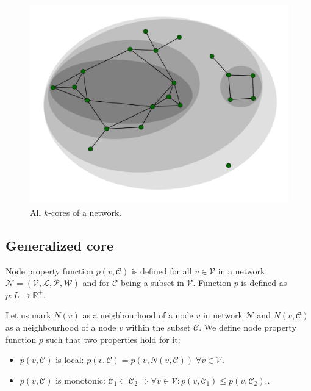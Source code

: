 \documentclass[a4paper,twoside,10pt]{article}
\newcommand{\C}{\mathcal{C}}
\newcommand{\R}{\mathbb{R}}
\begin{document}
\begin{figure}[!h]
	\centering
  \includegraphics[width=\textwidth]{./pics/kcore.pdf}
  \caption{All $k$-cores of a network.}
  \label{kcore}
\end{figure}


\subsection{Generalized core}

Node property function $p(v, \C)$ is defined for all $v \in \mathcal{V}$
in a network $\mathcal{N} = (\mathcal{V}, \mathcal{L}, \mathcal{P}, \mathcal{W})$ and for $\C$ being a subset in $\mathcal{V}$. Function $p$ is defined as $p: L \longrightarrow \R^+$.

Let us mark $N(v)$ as a neighbourhood of a node $v$ in network $\mathcal{N}$ and $N(v, \C)$ as a neighbourhood of a node $v$ within the subset $\C$. We define node property function $p$ such that two properties hold for it:
\begin{itemize}
\item $p(v, \C)$ is local: $p(v, \C) = p(v, N(v, \C)) \; \forall v \in \mathcal{V}$.
\item $p(v, \C)$ is monotonic: $\C_1 \subset \C_2 \Rightarrow \forall v \in \mathcal{V}: p(v, \C_1) \leq p(v, \C_2).$.
\end{itemize}
\end{document}
